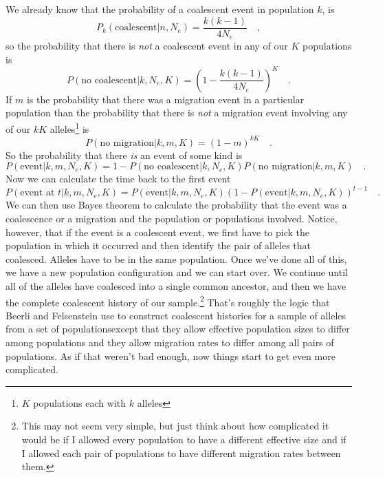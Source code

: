 \documentclass[12pt]{article}
\begin{document}
We already know that the probability of a coalescent event in
population $k$, is
\[
P_k(\mbox{coalescent}|n, N_e) = \frac{k(k-1)}{4N_e} \quad ,
\]
so the probability that there is {\it not\/} a coalescent event in any
of our $K$ populations is
\[
P(\mbox{no coalescent}|k, N_e, K) = \left(1-\frac{k(k-1)}{4N_e}\right)^K
\quad .
\]
If $m$ is the probability that there was a migration event in a
particular population than the probability that there is {\it not\/} a
migration event involving any of our $kK$ alleles\footnote{$K$ populations
each with $k$ alleles} is
\[
P(\mbox{no migration}|k,m, K) = (1-m)^{kK} \quad .
\]
So the probability that there {\it is\/} an event of some kind is
\[
P(\mbox{event}|k, m, N_e, K) = 1 - P(\mbox{no coalescent}|k, N_e,
K)P(\mbox{no migration}|k,m, K) \quad .\label{eq:event}
\]
Now we can calculate the time back to the first event
\[
P(\mbox{event at }t|k, m, N_e, K) = P(\mbox{event}|k, m, N_e,
K)\left(1 - P(\mbox{event}|k, m, N_e, K)\right)^{t-1} \quad . \label{eq:time-to-event}
\]
We can then use Bayes theorem to calculate the probability that the
event was a coalescence or a migration and the population or
populations involved. Notice, however, that if the event is a
coalescent event, we first have to pick the population in which it
occurred and then identify the pair of alleles that coalesced. Alleles
have to be in the same population. Once we've done all of this, we
have a new population configuration and we can start over. We continue
until all of the alleles have coalesced into a single common ancestor,
and then we have the complete coalescent history of our
sample.\footnote{This may not seem very simple, but just think about
  how complicated it would be if I allowed every population to have a
  different effective size and if I allowed each pair of populations
  to have different migration rates between them.} That's roughly the
logic that Beerli and Felsenstein use to construct coalescent
histories for a sample of alleles from a set of
populations{\dash}except that they allow effective population sizes to
differ among populations and they allow migration rates to differ
among all pairs of populations. As if that weren't bad enough, now
things start to get even more complicated.
\end{document}
